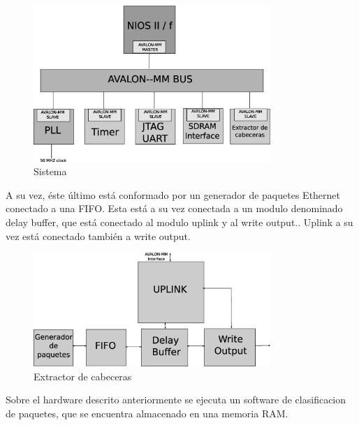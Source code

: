 \begin{figure}[h]
  \centering
	\includegraphics[width=0.80\textwidth]{2-sistema/graf/sistema.eps}
  \caption{Sistema}
  \label{fig}
\end{figure}

A su vez, éste último está conformado por un generador de paquetes Ethernet conectado a una FIFO. Esta está a su vez conectada a un modulo denominado delay buffer, que está conectado al modulo uplink y al write output.. Uplink a su vez está conectado también a write output.

\begin{figure}[h]
  \centering
	\includegraphics[width=0.80\textwidth]{2-sistema/graf/extractor.eps}
  \caption{Extractor de cabeceras}
  \label{fig}
\end{figure}

Sobre el hardware descrito anteriormente se ejecuta un software de clasificacion de paquetes, que se encuentra almacenado en una memoria RAM.



